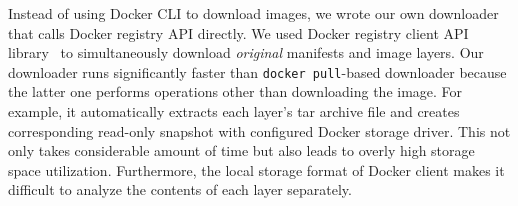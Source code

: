%
Instead of using Docker CLI to download images,
we wrote our own downloader that calls Docker registry API directly.
We used Docker registry client API~ library~\cite{docker-registry-library} to simultaneously
download \emph{original} manifests and image layers. 
%
%
%
%
%
Our downloader runs significantly
faster than \texttt{docker pull}-based downloader
because the latter one performs
operations other than downloading the
image.
%
For example, it automatically extracts each layer's tar archive file
and creates corresponding read-only snapshot with  configured Docker storage driver.
This
not only takes considerable amount of time but also leads
to overly high storage space utilization.
%
%
Furthermore, the local storage format of Docker client makes it difficult
to analyze the contents of each layer separately.
%
%

